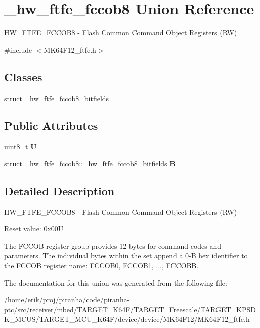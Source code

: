 \hypertarget{union__hw__ftfe__fccob8}{}\section{\+\_\+hw\+\_\+ftfe\+\_\+fccob8 Union Reference}
\label{union__hw__ftfe__fccob8}


H\+W\+\_\+\+F\+T\+F\+E\+\_\+\+F\+C\+C\+O\+B8 -\/ Flash Common Command Object Registers (RW)  




{\ttfamily \#include $<$M\+K64\+F12\+\_\+ftfe.\+h$>$}

\subsection*{Classes}
\begin{DoxyCompactItemize}
\item 
struct \hyperlink{struct__hw__ftfe__fccob8_1_1__hw__ftfe__fccob8__bitfields}{\+\_\+hw\+\_\+ftfe\+\_\+fccob8\+\_\+bitfields}
\end{DoxyCompactItemize}
\subsection*{Public Attributes}
\begin{DoxyCompactItemize}
\item 
uint8\+\_\+t {\bfseries U}\hypertarget{union__hw__ftfe__fccob8_a7f4aba61cdbdd207a5c7f07ba426fc3f}{}\label{union__hw__ftfe__fccob8_a7f4aba61cdbdd207a5c7f07ba426fc3f}

\item 
struct \hyperlink{struct__hw__ftfe__fccob8_1_1__hw__ftfe__fccob8__bitfields}{\+\_\+hw\+\_\+ftfe\+\_\+fccob8\+::\+\_\+hw\+\_\+ftfe\+\_\+fccob8\+\_\+bitfields} {\bfseries B}\hypertarget{union__hw__ftfe__fccob8_af43cf27816a4bd5e283cd55a9cdf9aaa}{}\label{union__hw__ftfe__fccob8_af43cf27816a4bd5e283cd55a9cdf9aaa}

\end{DoxyCompactItemize}


\subsection{Detailed Description}
H\+W\+\_\+\+F\+T\+F\+E\+\_\+\+F\+C\+C\+O\+B8 -\/ Flash Common Command Object Registers (RW) 

Reset value\+: 0x00U

The F\+C\+C\+OB register group provides 12 bytes for command codes and parameters. The individual bytes within the set append a 0-\/B hex identifier to the F\+C\+C\+OB register name\+: F\+C\+C\+O\+B0, F\+C\+C\+O\+B1, ..., F\+C\+C\+O\+BB. 

The documentation for this union was generated from the following file\+:\begin{DoxyCompactItemize}
\item 
/home/erik/proj/piranha/code/piranha-\/ptc/src/receiver/mbed/\+T\+A\+R\+G\+E\+T\+\_\+\+K64\+F/\+T\+A\+R\+G\+E\+T\+\_\+\+Freescale/\+T\+A\+R\+G\+E\+T\+\_\+\+K\+P\+S\+D\+K\+\_\+\+M\+C\+U\+S/\+T\+A\+R\+G\+E\+T\+\_\+\+M\+C\+U\+\_\+\+K64\+F/device/device/\+M\+K64\+F12/M\+K64\+F12\+\_\+ftfe.\+h\end{DoxyCompactItemize}
